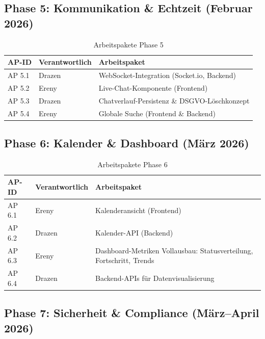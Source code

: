 \subsection{Phase 5: Kommunikation \& Echtzeit (Februar 2026)}

\begin{table}[H]
    \centering
    \caption{Arbeitspakete Phase 5}
    \begin{tabularx}{\textwidth}{llX}
        \toprule
        \textbf{AP-ID} & \textbf{Verantwortlich} & \textbf{Arbeitspaket} \\
        \midrule
        AP 5.1 & Drazen & WebSocket-Integration (Socket.io, Backend) \\
        AP 5.2 & Ereny  & Live-Chat-Komponente (Frontend) \\
        AP 5.3 & Drazen & Chatverlauf-Persistenz \& DSGVO-Löschkonzept \\
        AP 5.4 & Ereny  & Globale Suche (Frontend \& Backend) \\
        \bottomrule
    \end{tabularx}
    \label{tab:ap5}
\end{table}

\subsection{Phase 6: Kalender \& Dashboard (März 2026)}

\begin{table}[H]
    \centering
    \caption{Arbeitspakete Phase 6}
    \begin{tabularx}{\textwidth}{llX}
        \toprule
        \textbf{AP-ID} & \textbf{Verantwortlich} & \textbf{Arbeitspaket} \\
        \midrule
        AP 6.1 & Ereny  & Kalenderansicht (Frontend) \\
        AP 6.2 & Drazen & Kalender-API (Backend) \\
        AP 6.3 & Ereny  & Dashboard-Metriken Vollausbau:
                          Statusverteilung, Fortschritt, Trends \\
        AP 6.4 & Drazen & Backend-APIs für Datenvisualisierung \\
        \bottomrule
    \end{tabularx}
    \label{tab:ap6}
\end{table}

\subsection{Phase 7: Sicherheit \& Compliance (März--April 2026)}

